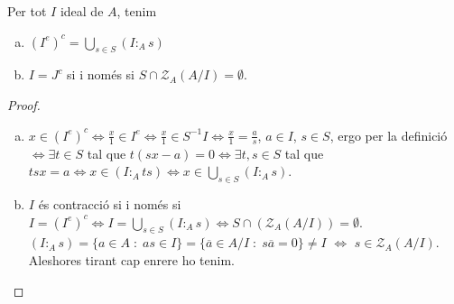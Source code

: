 \documentclass[../../../main.tex]{subfiles}
\begin{document}
\begin{prop}
\label{prop:caracteritzacioExtensioIdeals} Per tot $I$ ideal de $A$, tenim 
\begin{enumerate}[(a)]
    \item $(I^{e})^c = \bigcup_{s\in S}(I:_As)$
    \item $I = J^c$ si i només si $S\cap \mathcal{Z}_A(A/I)=\emptyset$.
\end{enumerate}
\end{prop}
\begin{proof}
\begin{enumerate}[(a)]
    \item $x\in (I^{e})^c\Longleftrightarrow \frac{x}{1}\in I^{e}\Longleftrightarrow \frac{x}{1}\in S^{-1}I\Longleftrightarrow \frac{x}{1} = \frac{a}{s}$, $a\in I$, $s\in S$, ergo per la definició $\Longleftrightarrow \exists t\in S$ tal que $t(sx-a) = 0 \Longleftrightarrow \exists t,s\in S$ tal que $tsx = a\Longleftrightarrow x\in (I:_Ats)\Longleftrightarrow x\in\bigcup_{s\in S}(I:_As)$.
    \item $I$ és contracció si i només si $I = (I^{e})^c\Longleftrightarrow I =\bigcup_{s\in S}(I:_As)\Longleftrightarrow S\cap (\mathcal{Z}_A(A/I)) = \emptyset$. $(I:_As) = \{a\in A\;:\;as\in I\} = \{\overline{a}\in A/I\;:\;s\overline{a} = 0\}\not=I$ $\Longleftrightarrow$ $s\in\mathcal{Z}_A(A/I)$. Aleshores tirant cap enrere ho tenim.
\end{enumerate}
\end{proof}
\end{document}
